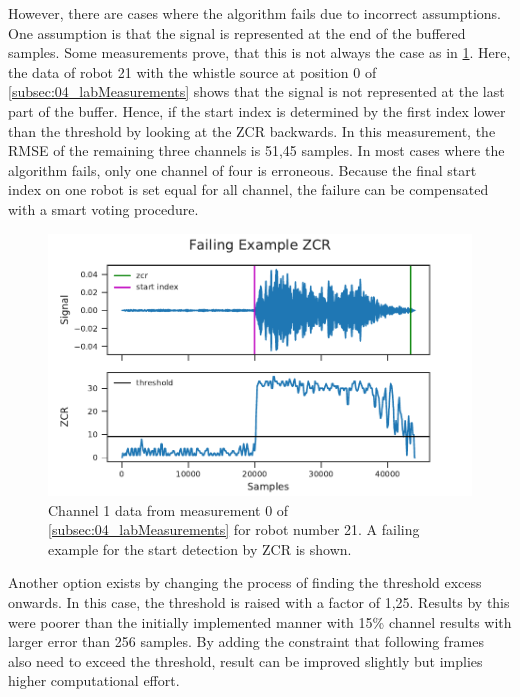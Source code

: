 However, there are cases where the algorithm fails due to incorrect assumptions.
One assumption is that the signal is represented at the end of the buffered
samples.
Some measurements prove, that this is not always the case as in \cref{fig:04_zcrFail}.
Here, the data of robot 21 with the whistle source at position 0 of \cref{subsec:04_labMeasurements}
shows that the signal is not represented at the last part of the buffer.
Hence, if the start index is determined by the first index lower than
the threshold by looking at the \ac{ZCR} backwards.
In this measurement, the \ac{RMSE} of the remaining three channels is
51,45 samples.
In most cases where the algorithm fails, only one channel of four
is erroneous.
Because the final start index on one robot is set equal for all channel,
the failure can be compensated with a smart voting procedure.
\begin{figure}[ht]
	\centering
		\includegraphics[]{figures/evaluation/zcr_fail}
    \caption{Channel 1 data from measurement 0 of \cref{subsec:04_labMeasurements}
             for robot number 21. A failing example for the start detection by \ac{ZCR}
             is shown.}
	\label{fig:04_zcrFail}
\end{figure}
Another option exists by changing the process of finding the
threshold excess onwards.
In this case, the threshold is raised with a factor of 1,25.
Results by this were poorer than the initially implemented manner
with 15\si{\percent} channel results with larger error than 256 samples.
By adding the constraint that following frames also need to exceed the
threshold, result can be improved slightly but implies higher
computational effort.

